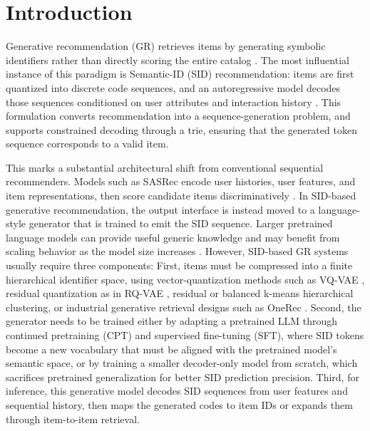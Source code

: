 \documentclass[preprint,12pt]{elsarticle}
\begin{document}
\section{Introduction}



Generative recommendation (GR) retrieves items by generating symbolic identifiers rather than directly scoring the entire catalog \citep{li2024large}. The most influential instance of this paradigm is Semantic-ID (SID) recommendation: items are first quantized into discrete code sequences, and an autoregressive model decodes those sequences conditioned on user attributes and interaction history \citep{rajput2023tiger,zheng2024letter,wang2024eager}. This formulation converts recommendation into a sequence-generation problem, and supports constrained decoding through a trie, ensuring that the generated token sequence corresponds to a valid item.

This marks a substantial architectural shift from conventional sequential recommenders. Models such as SASRec encode user histories, user features, and item representations, then score candidate items discriminatively \citep{kang2018sasrec}. In SID-based generative recommendation, the output interface is instead moved to a language-style generator that is trained to emit the SID sequence. Larger pretrained language models can provide useful generic knowledge and may benefit from scaling behavior as the model size increases \citep{kaplan2020scaling}. However, SID-based GR systems usually require three components: First, items must be compressed into a finite hierarchical identifier space, using vector-quantization methods such as VQ-VAE \citep{vandenoord2017vqvae}, residual quantization as in RQ-VAE \citep{lee2022rqvae}, residual or balanced k-means hierarchical clustering, or industrial generative retrieval designs such as OneRec \citep{deng2025onerec}. Second, the generator needs to be trained either by adapting a pretrained LLM through continued pretraining (CPT) and supervised fine-tuning (SFT), where SID tokens become a new vocabulary that must be aligned with the pretrained model's semantic space, or by training a smaller decoder-only model from scratch, which sacrifices pretrained generalization for better SID prediction precision. Third, for inference, this generative model decodes SID sequences from user features and sequential history, then maps the generated codes to item IDs or expands them through item-to-item retrieval. 
\end{document}
